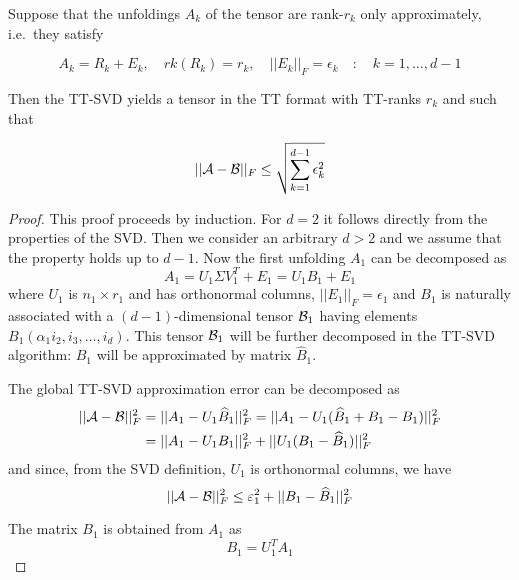 \begin{Teo} \label{teo:ttsvd_approx}
  Suppose that the unfoldings $A_k$ of the tensor \A are rank-$r_k$ only approximately, i.e.\ they satisfy

  \begin{equation} \label{teo:ttsvd_approx:ip:1}
  A_k = R_k + E_k, \quad rk(R_k) = r_k, \quad ||E_k||_F = \epsilon_k \quad:\quad k = 1,\ldots,d-1
  \end{equation}

  Then the TT-SVD yields a tensor \B in the TT format with TT-ranks $r_k$ and such that

  \begin{equation}
    ||\mathcal{A} - \mathcal{B} ||_F \le \sqrt{\sum_{k=1}^{d-1} \epsilon_k^2}
  \end{equation}
  
  \begin{proof}
    This proof proceeds by induction. For $d=2$ it follows directly from the properties of the SVD. Then we consider an arbitrary $d > 2$ and we assume that the property holds up to $d - 1$.  Now the first unfolding $A_1$ can be decomposed as
    \begin{equation*}
    A_1 = U_1 \Sigma V_1^T + E_1 = U_1 B_1 + E_1
    \end{equation*}
    where $U_1$ is $n_1 \times r_1$ and has orthonormal columns, $||E_1||_F = \epsilon_1$ and $B_1$ is naturally associated with a $(d-1)$-dimensional tensor $\mathcal{B}_1$ having elements $B_1(\alpha_1i_2,i_3,\ldots,i_d)$. This tensor $\mathcal{B}_1$ will be further decomposed in the TT-SVD algorithm: $B_1$ will be approximated by matrix $\hat{B}_1$.

    The global TT-SVD approximation error can be decomposed as
    \begin{equation*}
      \begin{split}
        ||\mathcal{A}-\mathcal{B}||_F^2 &= ||A_1 - U_1\widehat{B}_1||_F^2 = ||A_1 - U_1(\widehat{B}_1 + B_1 - B_1)||_F^2 \\
         &= ||A_1 - U_1 B_1||_F^2 + ||U_1(B_1 - \widehat{B}_1)||_F^2
      \end{split}
    \end{equation*}
    and since, from the SVD definition, $U_1$ is orthonormal columns, we have
    \begin{equation} \label{teo:ttsvd_approx:proof:bound}
      ||\mathcal{A} - \mathcal{B}||_F^2 \le \varepsilon_1^2 + ||B_1 - \widehat{B}_1 ||_F^2
    \end{equation}

    The matrix $B_1$ is obtained from $A_1$ as
    \begin{equation*}
    B_1 = U_1^T A_1
    \end{equation*}


\end{proof}
\end{Teo}
